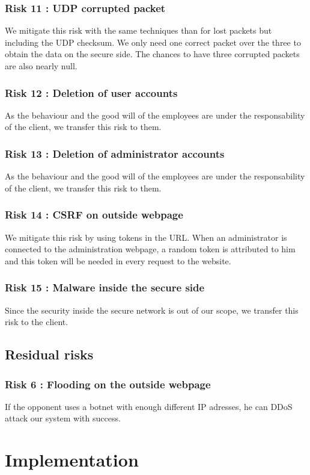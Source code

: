 \documentclass[a4paper,11pt]{article}
\begin{document}
\subsubsection{Risk 11 : UDP corrupted packet}
We mitigate this risk with the same techniques than for lost packets but including the UDP checksum. We only need one correct packet over the three to obtain the data on the secure side. The chances to have three corrupted packets are also nearly null.
\subsubsection{Risk 12 : Deletion of user accounts}
As the behaviour and the good will of the employees are under the responsability of the client, we transfer this risk to them.
\subsubsection{Risk 13 : Deletion of administrator accounts}
As the behaviour and the good will of the employees are under the responsability of the client, we transfer this risk to them.
\subsubsection{Risk 14 : CSRF on outside webpage}
We mitigate this risk by using tokens in the URL. When an administrator is connected to the administration webpage, a random token is attributed to him and this token will be needed in every request to the website.
\subsubsection{Risk 15 : Malware inside the secure side}
Since the security inside the secure network is out of our scope, we transfer this risk to the client.

\subsection{Residual risks}
\subsubsection{Risk 6 : Flooding on the outside webpage}
If the opponent uses a botnet with enough different IP adresses, he can DDoS attack our system with success.

\section{Implementation}
\end{document}
